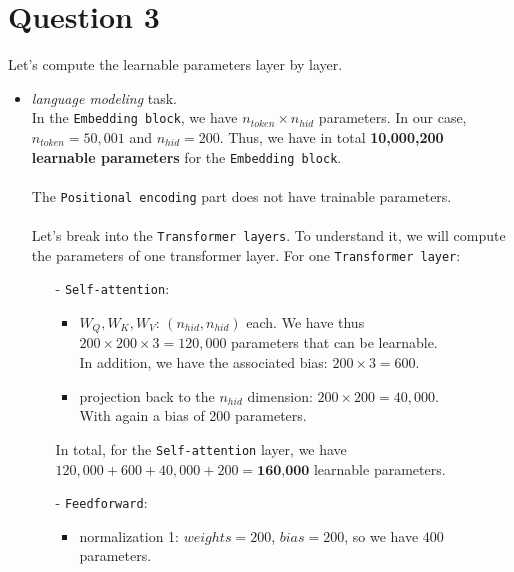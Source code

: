 \documentclass[a4paper]{article}
\begin{document}
\section*{Question 3}
Let's compute the learnable parameters layer by layer.
\\
\begin{itemize}
    \item \textit{language modeling} task.
        \vspace{.5cm}
        \\
        In the \texttt{Embedding block}, we have $n_{token} \times n_{hid}$ parameters.
        In our case, $n_{token} = 50,001$ and $n_{hid} = 200$. Thus, we have
        in total \textbf{10,000,200 learnable parameters} for the \texttt{Embedding block}.
        \\
        \\
        The \texttt{Positional encoding} part does not have trainable parameters.
        \\
        \\
        Let's break into the \texttt{Transformer layers}. To understand it, we will compute the
        parameters of one transformer layer.
        For one \texttt{Transformer layer}:
        \begin{itemize}
            \item[-] \texttt{Self-attention}:
                \begin{itemize}
                    \item $W_Q, W_K, W_V$: $(n_{hid}, n_{hid})$ each. We have thus 
                    $200 \times 200 \times 3 = 120,000$ parameters that can be learnable.
                    \\
                    In addition, we have the associated bias: $200 \times 3 = 600$. 
                    \item projection back to the $n_{hid}$ dimension: $200 \times 200 = 40,000$.
                    \\ With again a bias of 200 parameters.
                \end{itemize}
                In total, for the \texttt{Self-attention} layer, we have $120,000 + 600 + 40,000 + 200 = \textbf{160,000}$
                learnable parameters.
            \item[-] \texttt{Feedforward}:
                \begin{itemize}
                    \item normalization 1: $weights=200$, $bias=200$, so we have $400$ parameters.

\end{itemize}
\end{itemize}
\end{itemize}
\end{document}
